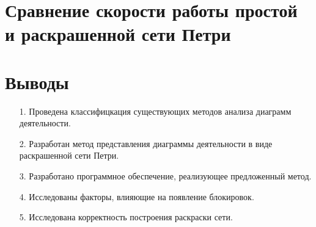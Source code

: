 \documentclass[12pt]{article}
\begin{document}
\section{Сравнение скорости работы простой и раскрашенной сети Петри}

\begin{center}
	\centering
\end{center}

\section{Выводы}

\begin{enumerate}
\item[1.] Проведена классифицкация существующих методов анализа диаграмм деятельности.
\item[2.] Разработан метод представления диаграммы деятельности в виде раскрашенной сети Петри.
\item[3.] Разработано программное обеспечение, реализующее предложенный метод.
\item[4.] Исследованы факторы, влияющие на появление блокировок.
\item[5.] Исследована корректность построения раскраски сети.
\end{enumerate}
\end{document}
